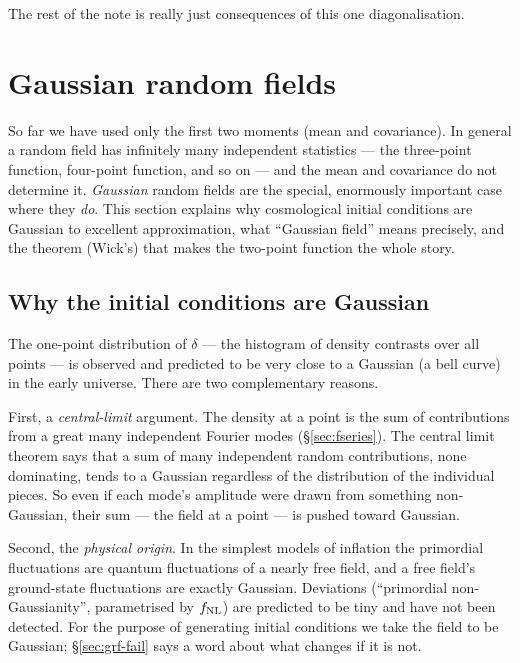 \documentclass[12pt]{article}
\begin{document}
The rest of the note is really just consequences of this one
diagonalisation.

\section{Gaussian random fields}
\label{sec:grf}

So far we have used only the first two moments (mean and covariance).
In general a random field has infinitely many independent statistics ---
the three-point function, four-point function, and so on --- and the
mean and covariance do not determine it.  \emph{Gaussian} random fields
are the special, enormously important case where they \emph{do}.  This
section explains why cosmological initial conditions are Gaussian to
excellent approximation, what ``Gaussian field'' means precisely, and
the theorem (Wick's) that makes the two-point function the whole story.

\subsection{Why the initial conditions are Gaussian}
\label{sec:grf-why}

The one-point distribution of $\delta$ --- the histogram of density
contrasts over all points --- is observed and predicted to be very
close to a Gaussian (a bell curve) in the early universe.  There are two
complementary reasons.

First, a \emph{central-limit} argument.  The density at a point is the
sum of contributions from a great many independent Fourier modes
(\S\ref{sec:fseries}).  The central limit theorem says that a sum of many
independent random contributions, none dominating, tends to a Gaussian
regardless of the distribution of the individual pieces.  So even if each
mode's amplitude were drawn from something non-Gaussian, their sum ---
the field at a point --- is pushed toward Gaussian.

Second, the \emph{physical origin}.  In the simplest models of inflation
the primordial fluctuations are quantum fluctuations of a nearly free
field, and a free field's ground-state fluctuations are exactly
Gaussian.  Deviations (``primordial non-Gaussianity'', parametrised by
$f_{\rm NL}$) are predicted to be tiny and have not been detected.  For
the purpose of generating initial conditions we take the field to be
Gaussian; \S\ref{sec:grf-fail} says a word about what changes if it is
not.
\end{document}

